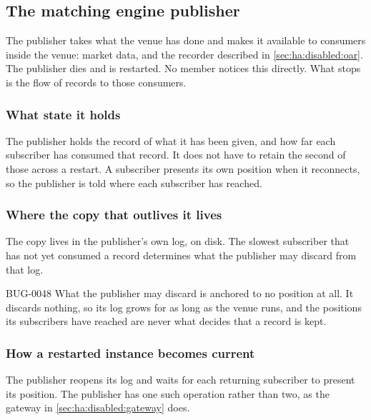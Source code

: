 \subsection{The matching engine publisher}
\label{sec:ha:disabled:mep}

The publisher takes what the venue has done and makes it available to consumers
inside the venue: market data, and the recorder described in
\cref{sec:ha:disabled:oar}. The publisher dies and is restarted. No member
notices this directly. What stops is the flow of records to those consumers.

\subsubsection{What state it holds}
\label{sec:ha:disabled:mep:state}

The publisher holds the record of what it has been given, and how far each
subscriber has consumed that record. It does not have to retain the second of
those across a restart. A subscriber presents its own position when it
reconnects, so the publisher is told where each subscriber has reached.

\subsubsection{Where the copy that outlives it lives}
\label{sec:ha:disabled:mep:durable}

The copy lives in the publisher's own log, on disk. The slowest subscriber that
has not yet consumed a record determines what the publisher may discard from that
log.

\begin{gap}{BUG-0048}
  What the publisher may discard is anchored to no position at all. It discards
  nothing, so its log grows for as long as the venue runs, and the positions its
  subscribers have reached are never what decides that a record is kept.
\end{gap}

\subsubsection{How a restarted instance becomes current}
\label{sec:ha:disabled:mep:recovery}

The publisher reopens its log and waits for each returning subscriber to present
its position. The publisher has one such operation rather than two, as the
gateway in \cref{sec:ha:disabled:gateway} does.


